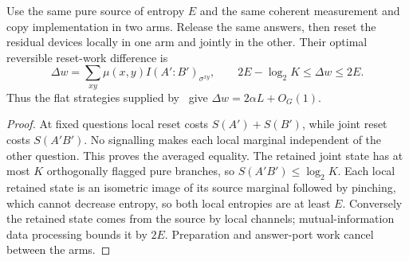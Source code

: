 \begin{proposition}\label{prop:paired}
Use the same pure source of entropy $E$ and the same coherent measurement and copy implementation in two arms. Release the same answers, then reset the residual devices locally in one arm and jointly in the other. Their optimal reversible reset-work difference is
\begin{equation}
 \Delta w=\sum_{xy}\mu(x,y)I(A':B')_{\sigma^{xy}},\qquad
 2E-\log_2K\le\Delta w\le2E.\label{eq:paired}
\end{equation}
Thus the flat strategies supplied by~\cite[Theorem 11.9(b)]{precision} give $\Delta w=2\alpha L+O_G(1)$.
\end{proposition}
\begin{proof}
At fixed questions local reset costs $S(A')+S(B')$, while joint reset costs $S(A'B')$. No signalling makes each local marginal independent of the other question. This proves the averaged equality. The retained joint state has at most $K$ orthogonally flagged pure branches, so $S(A'B')\le\log_2K$. Each local retained state is an isometric image of its source marginal followed by pinching, which cannot decrease entropy, so both local entropies are at least $E$. Conversely the retained state comes from the source by local channels; mutual-information data processing bounds it by $2E$. Preparation and answer-port work cancel between the arms.
\end{proof}

